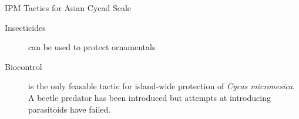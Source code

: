 \documentclass[]{beamer}
\begin{document}
\begin{frame}{IPM Tactics for Asian Cycad Scale}
\begin{description}
	\item[Insecticides] can be used to protect ornamentals
	\item[Biocontrol] is the only feasable tactic for island-wide protection of \textit{Cycas micronesica}. A beetle predator has been introduced but attempts at introducing parasitoids have failed.
\end{description}
\end{frame}
%


%
%
%
%
%
%
%
%
%
%
%
\end{document}
